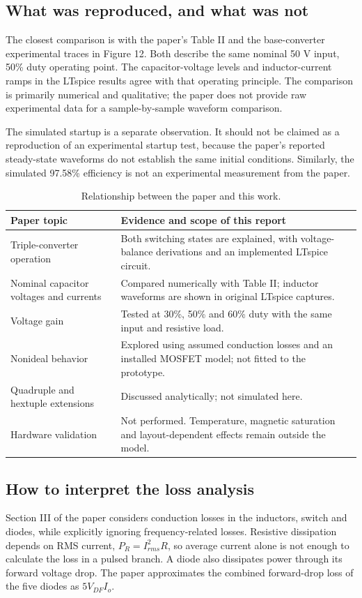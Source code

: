 \documentclass[11pt,a4paper]{article}
\begin{document}
\subsection{What was reproduced, and what was not}
The closest comparison is with the paper's Table II and the base-converter experimental traces in Figure 12. Both describe the same nominal 50 V input, 50\% duty operating point. The capacitor-voltage levels and inductor-current ramps in the LTspice results agree with that operating principle. The comparison is primarily numerical and qualitative; the paper does not provide raw experimental data for a sample-by-sample waveform comparison.

The simulated startup is a separate observation. It should not be claimed as a reproduction of an experimental startup test, because the paper's reported steady-state waveforms do not establish the same initial conditions. Similarly, the simulated 97.58\% efficiency is not an experimental measurement from the paper.
\begin{table}[H]\centering\caption{Relationship between the paper and this work.}
\begin{tabularx}{\linewidth}{@{}p{.29\linewidth}X@{}}\toprule
Paper topic & Evidence and scope of this report \\\midrule
Triple-converter operation & Both switching states are explained, with voltage-balance derivations and an implemented LTspice circuit. \\
Nominal capacitor voltages and currents & Compared numerically with Table II; inductor waveforms are shown in original LTspice captures. \\
Voltage gain & Tested at 30\%, 50\% and 60\% duty with the same input and resistive load. \\
Nonideal behavior & Explored using assumed conduction losses and an installed MOSFET model; not fitted to the prototype. \\
Quadruple and hextuple extensions & Discussed analytically; not simulated here. \\
Hardware validation & Not performed. Temperature, magnetic saturation and layout-dependent effects remain outside the model. \\\bottomrule
\end{tabularx}
\end{table}
\subsection{How to interpret the loss analysis}
Section III of the paper considers conduction losses in the inductors, switch and diodes, while explicitly ignoring frequency-related losses. Resistive dissipation depends on RMS current, $P_R=I_{rms}^2R$, so average current alone is not enough to calculate the loss in a pulsed branch. A diode also dissipates power through its forward voltage drop. The paper approximates the combined forward-drop loss of the five diodes as $5V_{DF}I_o$.
\end{document}
